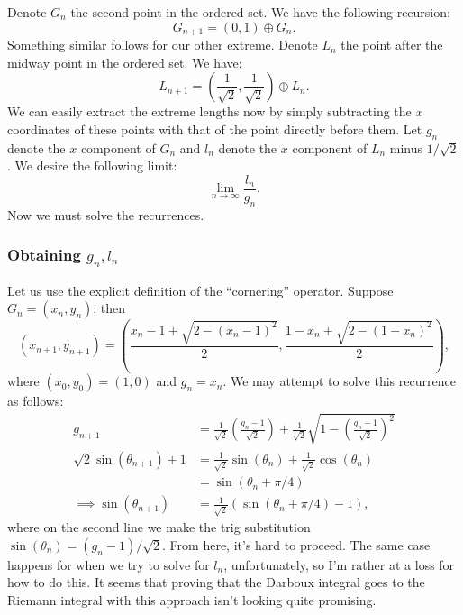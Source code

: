 \documentclass{article}
\begin{document}
Denote \( G_n \) the second point in the ordered set. We have the following recursion:
\[
    G_{n + 1} = \left( 0, 1 \right) \oplus G_n
.\]
Something similar follows for our other extreme. Denote \( L_n \) the point after the midway point in the ordered set. We have:
\[
    L_{n + 1} = \left( \frac{1}{\sqrt{2}}, \frac{1}{\sqrt{2}} \right) \oplus L_n
.\]
We can easily extract the extreme lengths now by simply subtracting the \( x \)
coordinates of these points with that of the point directly before them. Let \(
g_n \) denote the \( x \) component of \( G_n \) and \( l_n \) denote the \( x
\) component of \( L_n \) minus \( 1 / \sqrt{2} \). We desire the following
limit:
\[
    \lim_{n \to \infty} \frac{l_n}{g_n}
.\]
Now we must solve the recurrences.

\subsubsection*{Obtaining \( g_n, l_n \)}

Let us use the explicit definition of the ``cornering'' operator. Suppose \( G_n = \left( x_n, y_n \right) \); then
\[
    \left( x_{n + 1}, y_{n + 1} \right) = \left( \frac{x_n - 1 + \sqrt{2 - \left( x_n - 1 \right)^2}}{2}, \frac{1 - x_n + \sqrt{2 - \left( 1 - x_n \right)^2}}{2} \right)
,\]
where \( \left( x_0, y_0 \right) = \left( 1, 0 \right) \) and \( g_n = x_n \).
We may attempt to solve this recurrence as follows:
\begin{align*}
    g_{n+1} &= \frac{1}{\sqrt{2}} \left( \frac{g_n - 1}{\sqrt{2}} \right) + \frac{1}{\sqrt{2}} \sqrt{1 - \left( \frac{g_n - 1}{\sqrt{2}} \right)^2} \\
    \sqrt{2} \sin{\left( \theta_{n+1} \right)} + 1 &= \frac{1}{\sqrt{2}} \sin{\left( \theta_n \right)} + \frac{1}{\sqrt{2}} \cos{\left( \theta_n \right)} \\
    &= \sin{\left( \theta_n + \pi/4 \right)} \\
    \implies \sin{\left( \theta_{n+1} \right)} &= \frac{1}{\sqrt{2}} \left( \sin{\left( \theta_n + \pi/4 \right)} - 1 \right)
,\end{align*}
where on the second line we make the trig substitution \( \sin{\left( \theta_n
\right)} = \left( g_n - 1 \right) / \sqrt{2} \). From here, it's hard to
proceed. The same case happens for when we try to solve for \( l_n \),
unfortunately, so I'm rather at a loss for how to do this. It seems that
proving that the Darboux integral goes to the Riemann integral with this
approach isn't looking quite promising.
\end{document}
